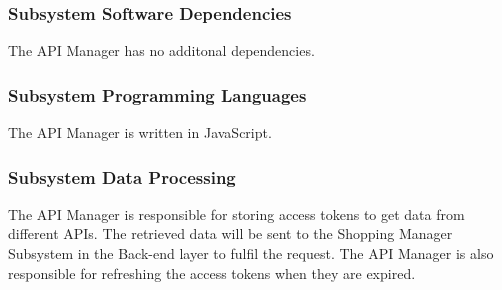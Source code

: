 \subsubsection{Subsystem Software Dependencies}
The API Manager has no additonal dependencies. 

\subsubsection{Subsystem Programming Languages}
The API Manager is written in JavaScript.

\subsubsection{Subsystem Data Processing}
The API Manager is responsible for storing access tokens to get data from different APIs. The retrieved data will be sent to the Shopping Manager Subsystem in the Back-end layer to fulfil the request. The API Manager is also responsible for refreshing the access tokens when they are expired.

